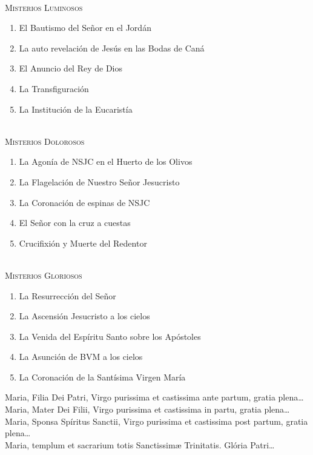 \documentclass[9pt]{article}
\begin{document}
\begin{multicols*}{2}
    \small{}\\
    \textsc{Misterios Luminosos}
    \begin{enumerate}
        \item El Bautismo del Señor en el Jordán
        \item La auto revelación de Jesús en las Bodas de Caná
        \item El Anuncio del Rey de Dios
        \item La Transfiguración
        \item La Institución de la Eucaristía
    \end{enumerate}

    \small{}\\
    \textsc{Misterios Dolorosos}
    \begin{enumerate}
        \item La Agonía de NSJC en el Huerto de los Olivos
        \item La Flagelación de Nuestro Señor Jesucristo
        \item La Coronación de espinas de NSJC
        \item El Señor con la cruz a cuestas
        \item Crucifixión y Muerte del Redentor
    \end{enumerate}

    \small{}\\
    \textsc{Misterios Gloriosos}
    \begin{enumerate}
        \item La Resurrección del Señor
        \item La Ascensión Jesucristo a los cielos
        \item La Venida del Espíritu Santo sobre los Apóstoles
        \item La Asunción de BVM a los cielos
        \item La Coronación de la Santísima Virgen María
    \end{enumerate}

    \bigskip

     Maria, Filia Dei Patri, Virgo purissima et castissima ante partum, gratia plena{\ldots}\\
     Maria, Mater Dei Filii, Virgo purissima et castissima in partu, gratia plena{\ldots}\\
     Maria, Sponsa Spíritus Sanctii, Virgo purissima et castissima post partum, gratia plena{\ldots}\\
     Maria, templum et sacrarium totis Sanctissimæ Trinitatis. Glória Patri{\ldots}\\


\end{multicols*}
\end{document}
